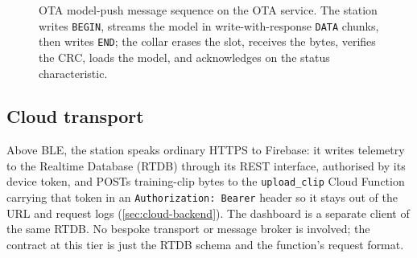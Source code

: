 \begin{figure}[ht]\centering
  \caption{OTA model-push message sequence on the OTA service. The station writes \texttt{BEGIN},
           streams the model in write-with-response \texttt{DATA} chunks, then writes \texttt{END}; the
           collar erases the slot, receives the bytes, verifies the CRC, loads the model, and
           acknowledges on the status characteristic.}
  \label{fig:ota-seq}
\end{figure}

\subsection{Cloud transport}

Above BLE, the station speaks ordinary HTTPS to Firebase: it writes telemetry to the Realtime Database
(RTDB) through its REST interface, authorised by its device token, and POSTs training-clip bytes to the
\texttt{upload\_clip} Cloud Function carrying that token in an \texttt{Authorization: Bearer} header so
it stays out of the URL and request logs (\cref{sec:cloud-backend}). The dashboard is a separate client
of the same RTDB. No bespoke transport or message broker is involved; the contract at this tier is just
the RTDB schema and the function's request format.
